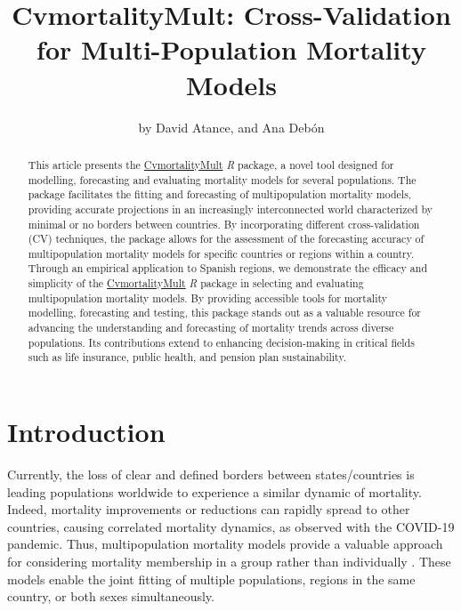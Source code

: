 \title{CvmortalityMult: Cross-Validation for Multi-Population Mortality Models}
\author{by David Atance, and Ana Debón}

\maketitle

\begin{abstract}
This article presents the \href{https://cran.r-project.org/web/packages/CvmortalityMult/index.html}{CvmortalityMult} \emph{R} package, a novel tool designed for modelling, forecasting and evaluating mortality models for several populations. The package facilitates the fitting and forecasting of multipopulation mortality models, providing accurate projections in an increasingly interconnected world characterized by minimal or no borders between countries. By incorporating different cross-validation (CV) techniques, the package allows for the assessment of the forecasting accuracy of multipopulation mortality models for specific countries or regions within a country. Through an empirical application to Spanish regions, we demonstrate the efficacy and simplicity of the \href{https://cran.r-project.org/web/packages/CvmortalityMult/index.html}{CvmortalityMult} \emph{R} package in selecting and evaluating multipopulation mortality models. By providing accessible tools for mortality modelling, forecasting and testing, this package stands out as a valuable resource for advancing the understanding and forecasting of mortality trends across diverse populations. Its contributions extend to enhancing decision-making in critical fields such as life insurance, public health, and pension plan sustainability.
\end{abstract}

\section{Introduction}\label{sec:intro}

\sloppy
Currently, the loss of clear and defined borders between states/countries is leading populations worldwide to experience a similar dynamic of mortality. Indeed, mortality improvements or reductions can rapidly spread to other countries, causing correlated mortality dynamics, as observed with the COVID-19 pandemic. Thus, multipopulation mortality models provide a valuable approach for considering mortality membership in a group rather than individually \citep{Li2005}. These models enable the joint fitting of multiple populations, regions in the same country, or both sexes simultaneously.

